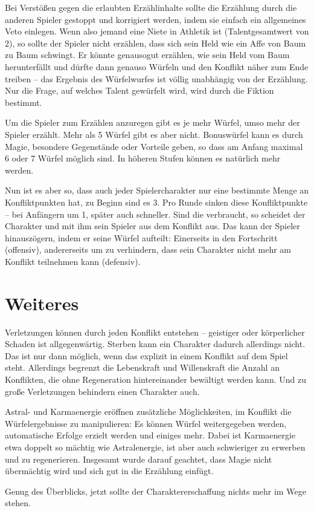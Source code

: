 Bei Verstößen gegen die erlaubten Erzählinhalte sollte die Erzählung durch die anderen Spieler gestoppt und korrigiert werden, indem sie einfach ein allgemeines Veto einlegen. Wenn also jemand eine Niete in Athletik ist (Talentgesamtwert von 2), so sollte der Spieler nicht erzählen, dass sich sein Held wie ein Affe von Baum zu Baum schwingt. Er könnte genausogut erzählen, wie sein Held vom Baum herunterfällt und dürfte dann genauso Würfeln und den Konflikt näher zum Ende treiben -- das Ergebnis des Würfelwurfes ist völlig unabhängig von der Erzählung. Nur die Frage, auf welches Talent gewürfelt wird, wird durch die Fiktion bestimmt.

Um die Spieler zum Erzählen anzuregen gibt es je mehr Würfel, umso mehr der Spieler erzählt. Mehr als 5 Würfel gibt es aber nicht. Bonuswürfel kann es durch Magie, besondere Gegenstände oder Vorteile geben, so dass am Anfang maximal 6 oder 7 Würfel möglich sind. In höheren Stufen können es natürlich mehr werden.

Nun ist es aber so, dass auch jeder Spielercharakter nur eine bestimmte Menge an Konfliktpunkten hat, zu Beginn sind es 3. Pro Runde sinken diese Konfliktpunkte -- bei Anfängern um 1, später auch schneller. Sind die verbraucht, so scheidet der Charakter und mit ihm sein Spieler aus dem Konflikt aus. Das kann der Spieler hinauszögern, indem er seine Würfel aufteilt: Einerseits in den Fortschritt (offensiv), andererseits um zu verhindern, dass sein Charakter nicht mehr am Konflikt teilnehmen kann (defensiv).

\section{Weiteres}
Verletzungen können durch jeden Konflikt entstehen -- geistiger oder körperlicher Schaden ist allgegenwärtig. Sterben kann ein Charakter dadurch allerdings nicht. Das ist nur dann möglich, wenn das explizit in einem Konflikt auf dem Spiel steht. Allerdings begrenzt die Lebenskraft und Willenskraft die Anzahl an Konflikten, die ohne Regeneration hintereinander bewältigt werden kann. Und zu große Verletzungen behindern einen Charakter auch.

Astral- und Karmaenergie eröffnen zusätzliche Möglichkeiten, im Konflikt die Würfelergebnisse zu manipulieren: Es können Würfel weitergegeben werden, automatische Erfolge erzielt werden und einiges mehr. Dabei ist Karmaenergie etwa doppelt so mächtig wie Astralenergie, ist aber auch schwieriger zu erwerben und zu regenerieren. Insgesamt wurde darauf geachtet, dass Magie nicht übermächtig wird und sich gut in die Erzählung einfügt.

Genug des Überblicks, jetzt sollte der Charaktererschaffung nichts mehr im Wege stehen.
\EN                      

